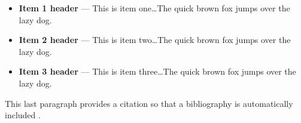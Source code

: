 \documentclass[11pt]{article}%
\begin{document}
\begin{multicols}{2}
\begin{itemize}
\item {\bf Item 1 header} --- This is item one\dots The quick brown fox jumps
over the lazy dog.
\item {\bf Item 2 header} --- This is item two\dots The quick brown fox jumps
over the lazy dog.
\item {\bf Item 3 header} --- This is item three\dots The quick brown fox jumps
over the lazy dog.
\end{itemize}

This last paragraph provides a citation so that a bibliography is
automatically included \cite{book:algorithms-4th-ed}.

\printbibliography %


\end{multicols}
\end{document}
